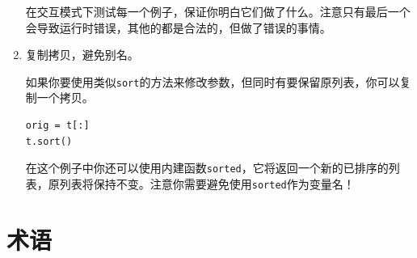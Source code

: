 \begin{enumerate}
在交互模式下测试每一个例子，保证你明白它们做了什么。注意只有最后一个会导致运行时错误，其他的都是合法的，但做了错误的事情。


\item 复制拷贝，避免别名。


如果你要使用类似{\tt sort}的方法来修改参数，但同时有要保留原列表，你可以复制一个拷贝。

\beforeverb
\begin{verbatim}
orig = t[:]
t.sort()
\end{verbatim}
\afterverb

在这个例子中你还可以使用内建函数{\tt sorted}，它将返回一个新的已排序的列表，原列表将保持不变。注意你需要避免使用{\tt sorted}作为变量名！

\end{enumerate}



\section{术语}

